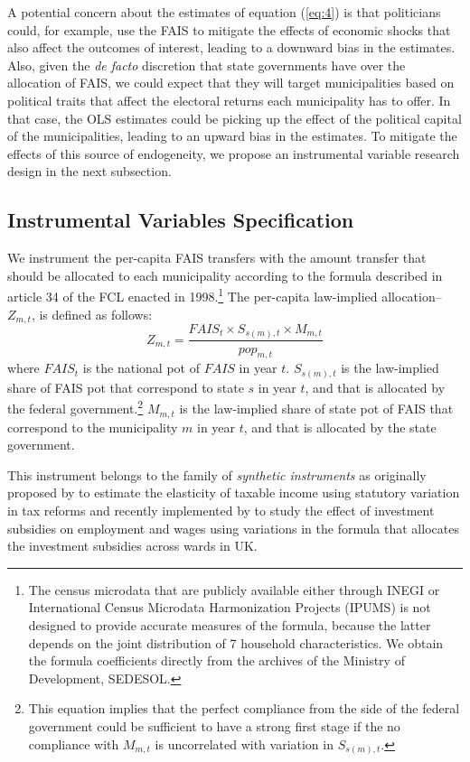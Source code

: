 \documentclass[dv_diss_main.tex]{subfiles}
\begin{document}
A potential concern about the estimates of equation (\ref{eq:4}) is that politicians could, for example, use the FAIS to mitigate the effects of economic shocks that also affect the outcomes of interest, leading to a downward bias in the estimates. Also, given the \textit{de facto} discretion that state governments have over the allocation of FAIS, we could expect that they will target municipalities based on political traits that affect the electoral returns each municipality has to offer. In that case, the OLS estimates could be picking up the effect of the political capital of the municipalities, leading to an upward bias in the estimates. To mitigate the effects of this source of endogeneity, we propose an instrumental variable research design in the next subsection.

\subsection{Instrumental Variables Specification} \label{subsec:variables}

We instrument the per-capita FAIS transfers with the amount transfer that should be allocated to each municipality according to the formula described in article 34 of the FCL enacted in 1998.\footnote{The census microdata that are publicly available either through INEGI or International Census Microdata Harmonization Projects (IPUMS) is not designed to provide accurate measures of the formula, because the latter depends on the joint distribution of 7 household characteristics. We obtain the formula coefficients directly from the archives of the Ministry of Development, SEDESOL.} The per-capita law-implied allocation--$Z_{m,t}$, is defined as follows:
\begin{equation}\label{eq:5}
  Z_{m,t}=\frac{FAIS_t \times S_{s(m),t} \times M_{m,t}}{pop_{m,t}}
\end{equation}
\noindent where $FAIS_t$ is the national pot of $FAIS$ in year $t$.
$S_{s(m),t}$ is the law-implied share of FAIS pot that correspond to state $s$ in year $t$, and that is allocated by the federal government.\footnote{This equation implies that the perfect compliance from the side of the federal government could be sufficient to have a strong first stage if the no compliance with $M_{m,t}$ is uncorrelated with variation in $S_{s(m),t}$.} $M_{m,t}$ is the law-implied share of state pot of FAIS that correspond to the municipality $m$ in year $t$, and that is allocated by the state government.

This instrument belongs to the family of \textit{synthetic instruments} as originally proposed by \cite{gruber2002elasticity} to estimate the elasticity of taxable income using statutory variation in tax reforms and recently implemented by \cite{criscuolo2019some} to study the effect of investment subsidies on employment and wages using variations in the formula that allocates the investment subsidies across wards in UK.
\end{document}
